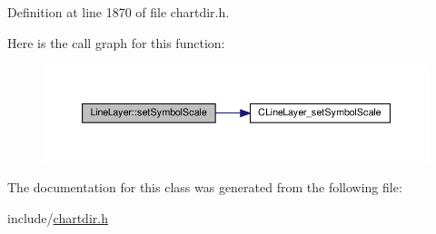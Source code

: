 Definition at line 1870 of file chartdir.\+h.

Here is the call graph for this function\+:
\nopagebreak
\begin{figure}[H]
\begin{center}
\leavevmode
\includegraphics[width=350pt]{class_line_layer_a895f509de10c66189649d10872db77ab_cgraph}
\end{center}
\end{figure}


The documentation for this class was generated from the following file\+:\begin{DoxyCompactItemize}
\item 
include/\hyperlink{chartdir_8h}{chartdir.\+h}\end{DoxyCompactItemize}
